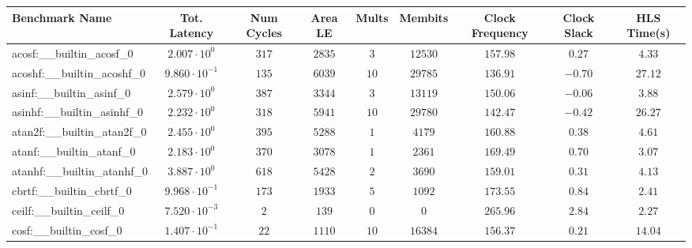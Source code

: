 \begin{tabular}{|l|c|c|c|c|c|c|c|c|}
\hline
Benchmark Name                            & Tot. Latency            & Num Cycles & Area LE    & Mults   & Membits    & Clock Frequency & Clock Slack & HLS Time(s) \\
\hline
acosf:\_\_builtin\_acosf\_0               & $ 2.007 \cdot 10^{0}  $ & $ 317    $ & $ 2835   $ & $ 3   $ & $ 12530  $ & $ 157.98      $ & $ 0.27    $ & $ 4.33    $ \\
acoshf:\_\_builtin\_acoshf\_0             & $ 9.860 \cdot 10^{-1} $ & $ 135    $ & $ 6039   $ & $ 10  $ & $ 29785  $ & $ 136.91      $ & $ -0.70   $ & $ 27.12   $ \\
asinf:\_\_builtin\_asinf\_0               & $ 2.579 \cdot 10^{0}  $ & $ 387    $ & $ 3344   $ & $ 3   $ & $ 13119  $ & $ 150.06      $ & $ -0.06   $ & $ 3.88    $ \\
asinhf:\_\_builtin\_asinhf\_0             & $ 2.232 \cdot 10^{0}  $ & $ 318    $ & $ 5941   $ & $ 10  $ & $ 29780  $ & $ 142.47      $ & $ -0.42   $ & $ 26.27   $ \\
atan2f:\_\_builtin\_atan2f\_0             & $ 2.455 \cdot 10^{0}  $ & $ 395    $ & $ 5288   $ & $ 1   $ & $ 4179   $ & $ 160.88      $ & $ 0.38    $ & $ 4.61    $ \\
atanf:\_\_builtin\_atanf\_0               & $ 2.183 \cdot 10^{0}  $ & $ 370    $ & $ 3078   $ & $ 1   $ & $ 2361   $ & $ 169.49      $ & $ 0.70    $ & $ 3.07    $ \\
atanhf:\_\_builtin\_atanhf\_0             & $ 3.887 \cdot 10^{0}  $ & $ 618    $ & $ 5428   $ & $ 2   $ & $ 3690   $ & $ 159.01      $ & $ 0.31    $ & $ 4.13    $ \\
cbrtf:\_\_builtin\_cbrtf\_0               & $ 9.968 \cdot 10^{-1} $ & $ 173    $ & $ 1933   $ & $ 5   $ & $ 1092   $ & $ 173.55      $ & $ 0.84    $ & $ 2.41    $ \\
ceilf:\_\_builtin\_ceilf\_0               & $ 7.520 \cdot 10^{-3} $ & $ 2      $ & $ 139    $ & $ 0   $ & $ 0      $ & $ 265.96      $ & $ 2.84    $ & $ 2.27    $ \\
cosf:\_\_builtin\_cosf\_0                 & $ 1.407 \cdot 10^{-1} $ & $ 22     $ & $ 1110   $ & $ 10  $ & $ 16384  $ & $ 156.37      $ & $ 0.21    $ & $ 14.04   $ \\

\end{tabular}
